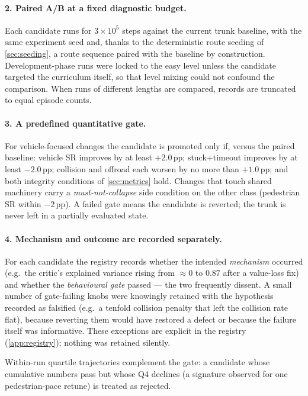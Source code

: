 \paragraph{2. Paired A/B at a fixed diagnostic budget.}
Each candidate runs for $3\times10^{5}$ steps against the current trunk
baseline, with the same experiment seed and, thanks to the deterministic
route seeding of \cref{sec:seeding}, a route sequence paired with the
baseline by construction. Development-phase runs were locked to the easy
level unless the candidate targeted the curriculum itself, so that level
mixing could not confound the comparison. When runs of different lengths
are compared, records are truncated to equal episode counts.

\paragraph{3. A predefined quantitative gate.}
For vehicle-focused changes the candidate is promoted only if, versus the
paired baseline: vehicle SR improves by at least $+2.0$\,pp;
stuck$+$timeout improves by at least $-2.0$\,pp; collision and offroad
each worsen by no more than $+1.0$\,pp; and both integrity conditions of
\cref{sec:metrics} hold. Changes that touch shared machinery carry a
\emph{must-not-collapse} side condition on the other class (pedestrian SR
within $-2$\,pp). A failed gate means the candidate is reverted; the trunk
is never left in a partially evaluated state.

\paragraph{4. Mechanism and outcome are recorded separately.}
For each candidate the registry records whether the intended
\emph{mechanism} occurred (e.g.\ the critic's explained variance rising
from $\approx 0$ to $0.87$ after a value-loss fix) and whether the
\emph{behavioural gate} passed --- the two frequently dissent. A small
number of gate-failing knobs were knowingly retained with the hypothesis
recorded as falsified (e.g.\ a tenfold collision penalty that left the
collision rate flat), because reverting them would have restored a defect
or because the failure itself was informative. These exceptions are
explicit in the registry (\cref{app:registry}); nothing was retained
silently.

Within-run quartile trajectories complement the gate: a candidate whose
cumulative numbers pass but whose Q4 declines (a signature observed for
one pedestrian-pace retune) is treated as rejected.

